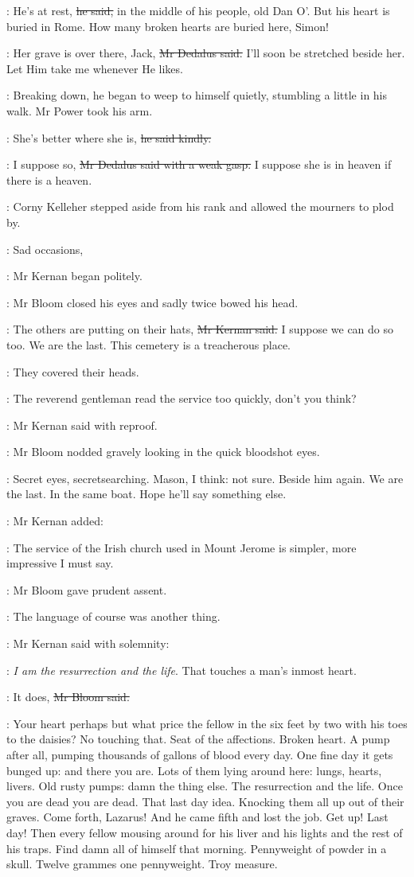 \power:
He's at rest,
\sout{he said,}
in the middle of his people, old Dan O'.
But his heart is buried in Rome.
How many broken hearts are buried here, Simon!

\simon:
Her grave is over there, Jack,
\sout{Mr Dedalus said.}
I'll soon be stretched beside her.
Let Him take me whenever He likes.

:
Breaking down, he began to weep to himself quietly,
stumbling a little in his walk.
Mr Power took his arm.

\power:
She's better where she is,
\sout{he said kindly.}

\simon:
I suppose so,
\sout{Mr Dedalus said with a weak gasp.}
I suppose she is in heaven if there is a heaven.

:
Corny Kelleher stepped aside from his rank and allowed the mourners to plod by.

:
Sad occasions,

:
Mr Kernan began politely.

:
Mr Bloom closed his eyes and sadly twice bowed his head.

:
The others are putting on their hats,
\sout{Mr Kernan said.}
I suppose we can do so too.
We are the last.
This cemetery is a treacherous place.

:
They covered their heads.

:
The reverend gentleman read the service too quickly, don't you think?

:
Mr Kernan said with reproof.

:
Mr Bloom nodded gravely looking in the quick bloodshot eyes.

\BloomInt:
Secret eyes, secretsearching.
Mason, I think:
not sure.
Beside him again.
We are the last.
In the same boat.
Hope he'll say something else.

:
Mr Kernan added:

:
The service of the Irish church used in Mount Jerome is simpler,
more impressive I must say.

:
Mr Bloom gave prudent assent.

\BloomInt:
The language of course was another thing.

:
Mr Kernan said with solemnity:

:
\emph{I am the resurrection and the life}.
That touches a man's inmost heart.

\Bloom:
It does,
\sout{Mr Bloom said.}

\BloomInt:
Your heart perhaps but what price the fellow
in the six feet by two
with his toes to the daisies?
No touching that.
Seat of the affections.
Broken heart.
A pump after all, pumping thousands of gallons of blood every day.
One fine day it gets bunged up:
and there you are.
Lots of them lying around here:
lungs, hearts, livers.
Old rusty pumps:
damn the thing else.
The resurrection and the life.
Once you are dead you are dead.
That last day idea.
Knocking them all up out of their graves.
Come forth, Lazarus!
And he came fifth and lost the job.
Get up!
Last day!
Then every fellow mousing around for his liver and his lights
and the rest of his traps.
Find damn all of himself that morning.
Pennyweight of powder in a skull.
Twelve grammes one pennyweight.
Troy measure.

